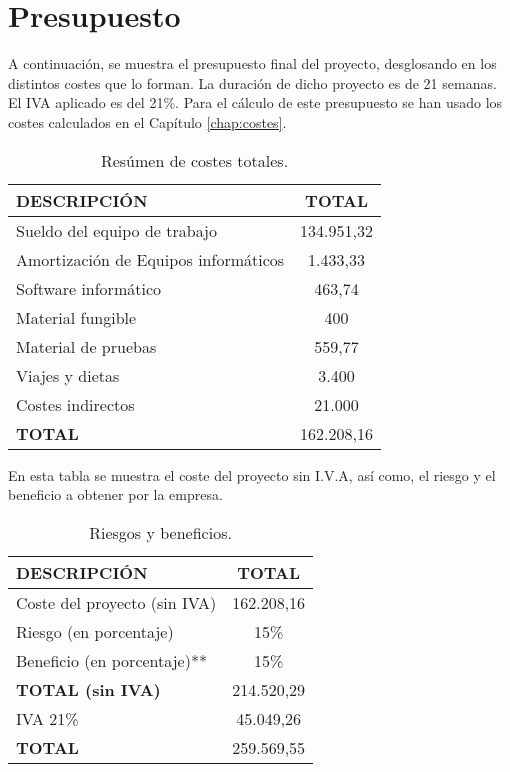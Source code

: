 \section{Presupuesto}

\par A continuación, se muestra el presupuesto final del proyecto, desglosando en los distintos costes que lo forman. La duración de dicho proyecto es de 21 semanas. El IVA aplicado es del 21\%. Para el cálculo de este presupuesto se han usado los costes calculados en el Capítulo \ref{chap:costes}.



\begin{table}[H]
\begin{center}
\begin{tabular}{l c}
\textbf{DESCRIPCIÓN} & \textbf{TOTAL}\\ \hline \hline
Sueldo del equipo de trabajo & 134.951,32\\
Amortización de Equipos informáticos & 1.433,33\\
Software informático & 463,74\\
Material fungible & 400\\
Material de pruebas & 559,77\\
Viajes y dietas & 3.400\\
Costes indirectos & 21.000\\ \hline \hline
\textbf{TOTAL} & 162.208,16\\ \hline
\end{tabular}
\caption{Resúmen de costes totales.}
\label{tab:resumenTotal}
\end{center}
\end{table}

En esta tabla se muestra el coste del proyecto sin I.V.A, así como, el riesgo y el beneficio a obtener por la empresa.
\begin{table}[H]
\begin{center}
\begin{tabular}{l c}
\textbf{DESCRIPCIÓN} & \textbf{TOTAL}\\ \hline \hline
Coste del proyecto (sin IVA) & 162.208,16\\
Riesgo (en porcentaje) & 15\% \\
Beneficio (en porcentaje)** & 15\% \\ \hline \hline
\textbf{TOTAL (sin IVA)} & 214.520,29\\ \hline \hline
IVA 21\% & 45.049,26 \\\hline \hline
\textbf{TOTAL} & 259.569,55\\ \hline
\end{tabular}
\caption{Riesgos y beneficios.}
\label{tab:total}
\end{center}
\end{table}



